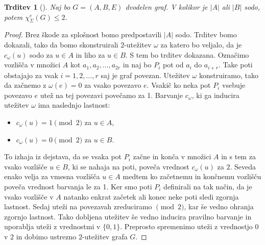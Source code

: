 \documentclass[12pt,a4paper,twoside]{article}
\theoremstyle{definition} %
\theoremstyle{plain} %
\newtheorem{trditev}[definicija]{Trditev}
\newcommand{\ec}{\chi_{\Sigma}^e}
\numberwithin{equation}{section}  %
\begin{document}
\begin{trditev}[\citet{examples}]
\label{dvosodo}	
Naj bo $G =(A,B,E)$ dvodelen graf. V kolikor je $|A|$ ali $|B|$ sodo, potem $\ec(G) \le 2$.
\end{trditev}
\begin{proof}
Brez škode za splošnost bomo predpostavili $|A|$ sodo. Trditev bomo dokazali, tako da bomo skonstruirali $2$-utežitev $\omega$ za katero bo veljalo, da je $c_{\omega}(u)$ sodo za $u \in A$ in liho za $u \in B$. S tem bo trditev dokazana. Označimo vozlišča v množici $A$ kot $a_1, a_2, \ldots, a_{2r}$ in naj bo $P_i$ pot od $a_i$ do $a_{i + r}$. Take poti obstajajo za vsak $i = 1, 2, \ldots, r$ saj je graf povezan. Utežitev $\omega$ konstruiramo, tako da začnemo z $\omega(e) = 0$ za vsako povezavo $e$. Vsakič ko neka pot $P_i$ vsebuje povezavo $e$ utež na tej povezavi povečamo za 1. Barvanje $c_{\omega}$, ki ga inducira utežitev $\omega$ ima naslednjo lastnost:
\begin{itemize}
\item $c_{\omega}(u) = 1 \pmod{2}$ za $u \in A$,
\item $c_{\omega}(u) = 0 \pmod{2}$ za $u \in B$.
\end{itemize}
To izhaja iz dejstava, da se vsaka pot $P_i$ začne in konča v množici $A$ in s tem za vsako vozlišče $u \in B$, ki se nahaja na poti, poveča vrednost $c_{\omega}(u)$ za $2$. Seveda enako velja za vmesna vozlišča $u \in A$ medtem ko začetnemu in končnemu vozlišču poveča vrednost barvanja le za 1. Ker smo poti $P_i$ definirali na tak način, da je vsako vozlišče v $A$ natanko enkrat začetek ali konec neke poti sledi zgornja lastnost. Sedaj uteži na povezavah zreduciramo $\pmod{2}$, kar še vedno ohranja zgornjo lastnost. Tako dobljena utežitev še vedno inducira pravilno barvanje in uporablja uteži z vrednostmi  v $\{0,1\}$. Preprosto spremenimo uteži z vrednostjo $0$ v $2$ in dobimo ustrezno $2$-utežitev grafa $G$.
\end{proof}
\end{document}

